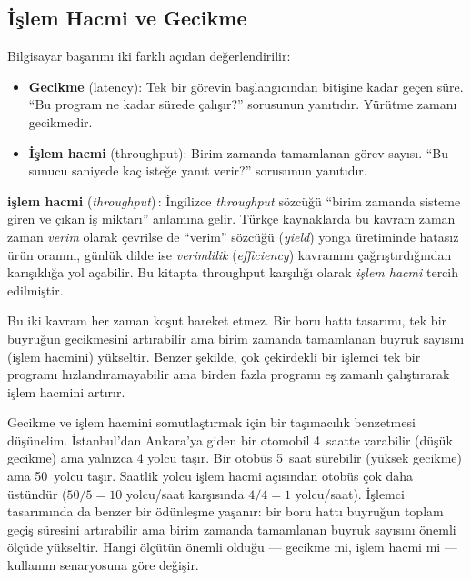 \subsection{İşlem Hacmi ve Gecikme}
\label{subsec:verim-gecikme}

Bilgisayar başarımı iki farklı açıdan değerlendirilir:

\begin{itemize}
    \item \textbf{Gecikme} (latency): Tek bir görevin başlangıcından bitişine kadar geçen süre. ``Bu program ne kadar sürede çalışır?'' sorusunun yanıtıdır. Yürütme zamanı gecikmedir.
    \item \textbf{İşlem hacmi} (throughput): Birim zamanda tamamlanan görev sayısı. ``Bu sunucu saniyede kaç isteğe yanıt verir?'' sorusunun yanıtıdır.
\end{itemize}

\begin{terimnotu}
\textbf{işlem hacmi} (\emph{throughput})\,: İngilizce \emph{throughput} sözcüğü ``birim zamanda sisteme giren ve çıkan iş miktarı'' anlamına gelir. Türkçe kaynaklarda bu kavram zaman zaman \emph{verim} olarak çevrilse de ``verim'' sözcüğü (\emph{yield}) yonga üretiminde hatasız ürün oranını, günlük dilde ise \emph{verimlilik} (\emph{efficiency}) kavramını çağrıştırdığından karışıklığa yol açabilir. Bu kitapta throughput karşılığı olarak \emph{işlem hacmi} tercih edilmiştir.
\end{terimnotu}

Bu iki kavram her zaman koşut hareket etmez. Bir boru hattı tasarımı, tek bir buyruğun gecikmesini artırabilir ama birim zamanda tamamlanan buyruk sayısını (işlem hacmini) yükseltir. Benzer şekilde, çok çekirdekli bir işlemci tek bir programı hızlandıramayabilir ama birden fazla programı eş zamanlı çalıştırarak işlem hacmini artırır.

Gecikme ve işlem hacmini somutlaştırmak için bir taşımacılık benzetmesi düşünelim. İstanbul'dan Ankara'ya giden bir otomobil 4~saatte varabilir (düşük gecikme) ama yalnızca 4 yolcu taşır. Bir otobüs 5~saat sürebilir (yüksek gecikme) ama 50~yolcu taşır. Saatlik yolcu işlem hacmi açısından otobüs çok daha üstündür ($50/5 = 10$ yolcu/saat karşısında $4/4 = 1$ yolcu/saat). İşlemci tasarımında da benzer bir ödünleşme yaşanır: bir boru hattı buyruğun toplam geçiş süresini artırabilir ama birim zamanda tamamlanan buyruk sayısını önemli ölçüde yükseltir. Hangi ölçütün önemli olduğu --- gecikme mi, işlem hacmi mi --- kullanım senaryosuna göre değişir.

